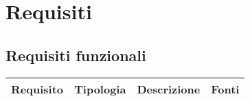\section{Requisiti }

\subsection{Requisiti funzionali }

      \begin{center}
      \begin{longtable}{ | p{2cm} | p{2cm} | p{5cm} | p{2cm} |}
    
      \cellcolor[gray]{0.9} \textbf{Requisito} & \cellcolor[gray]{0.9} \textbf{Tipologia} 
      & \cellcolor[gray]{0.9} \textbf{Descrizione} & \cellcolor[gray]{0.9} \textbf{Fonti} \\ \hline


\end{longtable}
\end{center}
